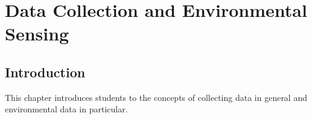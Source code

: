 \chapter{Data Collection and Environmental Sensing}

\section{Introduction}
This chapter introduces students to the concepts of collecting data in general and environmental data in particular.
